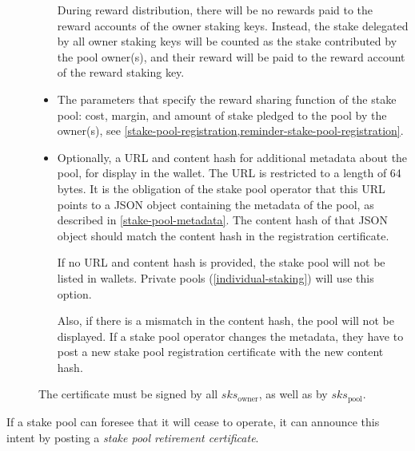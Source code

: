 \documentclass[11pt,a4paper]{article}
\begin{document}
\begin{description}
\begin{itemize}
  During reward distribution, there will be no rewards paid to the reward
  accounts of the owner staking keys. Instead, the stake delegated by all owner
  staking keys will be counted as the stake contributed by the pool owner(s),
  and their reward will be paid to the reward account of the reward staking key.

\item
  The parameters that specify the reward sharing function of the stake
  pool: cost, margin, and amount of stake pledged to the pool by the
  owner(s), see \cref{stake-pool-registration,reminder-stake-pool-registration}.

\item
  Optionally, a URL and content hash for additional metadata about the pool, for
  display in the wallet. The URL is restricted to a length of 64 bytes. It is
  the obligation of the stake pool operator that this URL points to a JSON
  object containing the metadata of the pool, as described in
  \cref{stake-pool-metadata}. The content hash of that JSON object should match
  the content hash in the registration certificate.

  If no URL and content hash is provided, the stake pool will not be listed in
  wallets. Private pools (\cref{individual-staking}) will use this option.

  Also, if there is a mismatch in the content hash, the pool will not be
  displayed. If a stake pool operator changes the metadata, they have to post a
  new stake pool registration certificate with the new content hash.
\end{itemize}

The certificate must be signed by all \(sks_\text{owner}\), as well as
by \(sks_\text{pool}\).

\end{description}

If a stake pool can foresee that it will cease to operate, it can
announce this intent by posting a \emph{stake pool retirement
certificate}.
\end{document}
